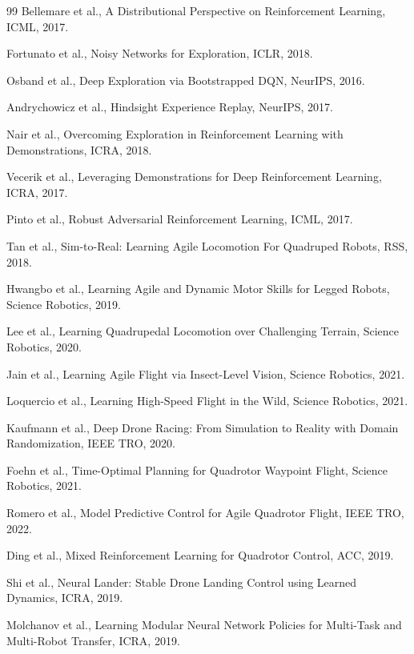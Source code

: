 \documentclass[12pt,a4paper]{ctexart}
\begin{document}
\begin{thebibliography}{99}
 Bellemare et al., A Distributional Perspective on Reinforcement Learning, ICML, 2017.

 Fortunato et al., Noisy Networks for Exploration, ICLR, 2018.

 Osband et al., Deep Exploration via Bootstrapped DQN, NeurIPS, 2016.

 Andrychowicz et al., Hindsight Experience Replay, NeurIPS, 2017.

 Nair et al., Overcoming Exploration in Reinforcement Learning with Demonstrations, ICRA, 2018.

 Vecerik et al., Leveraging Demonstrations for Deep Reinforcement Learning, ICRA, 2017.

 Pinto et al., Robust Adversarial Reinforcement Learning, ICML, 2017.

 Tan et al., Sim-to-Real: Learning Agile Locomotion For Quadruped Robots, RSS, 2018.

 Hwangbo et al., Learning Agile and Dynamic Motor Skills for Legged Robots, Science Robotics, 2019.

 Lee et al., Learning Quadrupedal Locomotion over Challenging Terrain, Science Robotics, 2020.

 Jain et al., Learning Agile Flight via Insect-Level Vision, Science Robotics, 2021.

 Loquercio et al., Learning High-Speed Flight in the Wild, Science Robotics, 2021.

 Kaufmann et al., Deep Drone Racing: From Simulation to Reality with Domain Randomization, IEEE TRO, 2020.

 Foehn et al., Time-Optimal Planning for Quadrotor Waypoint Flight, Science Robotics, 2021.

 Romero et al., Model Predictive Control for Agile Quadrotor Flight, IEEE TRO, 2022.

 Ding et al., Mixed Reinforcement Learning for Quadrotor Control, ACC, 2019.

 Shi et al., Neural Lander: Stable Drone Landing Control using Learned Dynamics, ICRA, 2019.

 Molchanov et al., Learning Modular Neural Network Policies for Multi-Task and Multi-Robot Transfer, ICRA, 2019.


\end{thebibliography}
\end{document}
